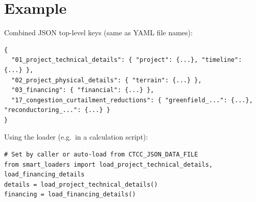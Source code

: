 \documentclass[ctcc_full_documentation.tex]{subfiles}
\begin{document}
\section{Example}

Combined JSON top-level keys (same as YAML file names):
\begin{lstlisting}
{
  "01_project_technical_details": { "project": {...}, "timeline": {...} },
  "02_project_physical_details": { "terrain": {...} },
  "03_financing": { "financial": {...} },
  "17_congestion_curtailment_reductions": { "greenfield_...": {...}, "reconductoring_...": {...} }
}
\end{lstlisting}

Using the loader (e.g.\ in a calculation script):
\begin{lstlisting}
# Set by caller or auto-load from CTCC_JSON_DATA_FILE
from smart_loaders import load_project_technical_details, load_financing_details
details = load_project_technical_details()
financing = load_financing_details()
\end{lstlisting}
\end{document}
